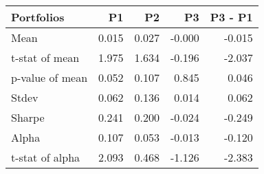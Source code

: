 \begin{tabular}{lrrrr}
\toprule
Portfolios & P1 & P2 & P3 & P3 - P1 \\
\midrule
Mean & 0.015 & 0.027 & -0.000 & -0.015 \\
t-stat of mean & 1.975 & 1.634 & -0.196 & -2.037 \\
p-value of mean & 0.052 & 0.107 & 0.845 & 0.046 \\
Stdev & 0.062 & 0.136 & 0.014 & 0.062 \\
Sharpe & 0.241 & 0.200 & -0.024 & -0.249 \\
Alpha & 0.107 & 0.053 & -0.013 & -0.120 \\
t-stat of alpha & 2.093 & 0.468 & -1.126 & -2.383 \\
\bottomrule
\end{tabular}
